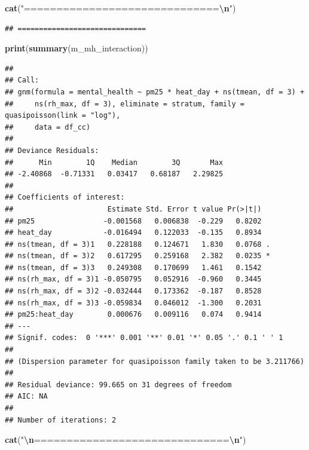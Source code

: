 \documentclass[
]{article}
\newenvironment{Shaded}{\begin{snugshade}}{\end{snugshade}}
\newcommand{\FunctionTok}[1]{\textcolor[rgb]{0.13,0.29,0.53}{\textbf{#1}}}
\newcommand{\NormalTok}[1]{#1}
\newcommand{\SpecialCharTok}[1]{\textcolor[rgb]{0.81,0.36,0.00}{\textbf{#1}}}
\newcommand{\StringTok}[1]{\textcolor[rgb]{0.31,0.60,0.02}{#1}}
\begin{document}
\begin{Shaded}
\begin{Highlighting}[]
\FunctionTok{cat}\NormalTok{(}\StringTok{"==============================}\SpecialCharTok{\textbackslash{}n}\StringTok{"}\NormalTok{)}
\end{Highlighting}
\end{Shaded}

\begin{verbatim}
## ==============================
\end{verbatim}

\begin{Shaded}
\begin{Highlighting}[]
\FunctionTok{print}\NormalTok{(}\FunctionTok{summary}\NormalTok{(m\_mh\_interaction))}
\end{Highlighting}
\end{Shaded}

\begin{verbatim}
## 
## Call:
## gnm(formula = mental_health ~ pm25 * heat_day + ns(tmean, df = 3) + 
##     ns(rh_max, df = 3), eliminate = stratum, family = quasipoisson(link = "log"), 
##     data = df_cc)
## 
## Deviance Residuals: 
##      Min        1Q    Median        3Q       Max  
## -2.40868  -0.71331   0.03417   0.68187   2.29825  
## 
## Coefficients of interest:
##                      Estimate Std. Error t value Pr(>|t|)  
## pm25                -0.001568   0.006838  -0.229   0.8202  
## heat_day            -0.016494   0.122033  -0.135   0.8934  
## ns(tmean, df = 3)1   0.228188   0.124671   1.830   0.0768 .
## ns(tmean, df = 3)2   0.617295   0.259168   2.382   0.0235 *
## ns(tmean, df = 3)3   0.249308   0.170699   1.461   0.1542  
## ns(rh_max, df = 3)1 -0.050795   0.052916  -0.960   0.3445  
## ns(rh_max, df = 3)2 -0.032444   0.173362  -0.187   0.8528  
## ns(rh_max, df = 3)3 -0.059834   0.046012  -1.300   0.2031  
## pm25:heat_day        0.000676   0.009116   0.074   0.9414  
## ---
## Signif. codes:  0 '***' 0.001 '**' 0.01 '*' 0.05 '.' 0.1 ' ' 1
## 
## (Dispersion parameter for quasipoisson family taken to be 3.211766)
## 
## Residual deviance: 99.665 on 31 degrees of freedom
## AIC: NA
## 
## Number of iterations: 2
\end{verbatim}

\begin{Shaded}
\begin{Highlighting}[]
\FunctionTok{cat}\NormalTok{(}\StringTok{"}\SpecialCharTok{\textbackslash{}n}\StringTok{==============================}\SpecialCharTok{\textbackslash{}n}\StringTok{"}\NormalTok{)}
\end{Highlighting}
\end{Shaded}
\end{document}
